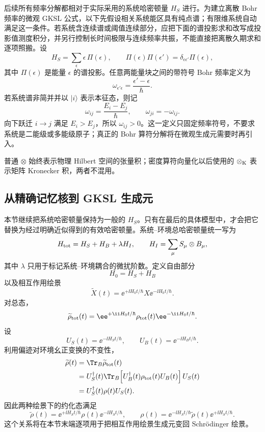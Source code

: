 后续所有频率分解都相对于实际采用的系统哈密顿量 $H_S$ 进行。为建立离散 Bohr 频率的微观 GKSL 公式，以下先假设相关系统能区具有纯点谱；有限维系统自动满足这一条件。若系统含连续谱或阈值连续部分，应把下面的谱投影求和改写成投影值测度积分，并另行控制长时间极限与连续频率共振，不能直接把离散久期求和逐项照搬。设
\begin{equation}
H_S=\sum_{\epsilon}\epsilon\,\Pi(\epsilon),
\qquad
\Pi(\epsilon)\Pi(\epsilon')=\delta_{\epsilon\epsilon'}\Pi(\epsilon),
\label{eq:phys-oqs-system-spectral-resolution}
\end{equation}
其中 $\Pi(\epsilon)$ 是能量 $\epsilon$ 的谱投影。任意两能量块之间的带符号 Bohr 频率定义为
\[
\omega_{\epsilon'\epsilon}=\frac{\epsilon'-\epsilon}{\hbar}.
\]
若系统谱非简并并以 $|i\rangle$ 表示本征态，则记
\begin{equation}
\omega_{ij}=\frac{E_i-E_j}{\hbar},
\qquad
\omega_{ji}=-\omega_{ij}.
\label{eq:phys-oqs-bohr-signed}
\end{equation}
向下跃迁 $i\to j$ 满足 $E_i>E_j$，所以 $\omega_{ij}>0$。这一定义只固定频率符号，不要求系统是二能级或多能级原子；真正的 Bohr 算符分解将在微观生成元需要时再引入。

普通 $\otimes$ 始终表示物理 Hilbert 空间的张量积；密度算符向量化以后使用的 $\mathbin{\otimes_{\rm K}}$ 表示矩阵 Kronecker 积，两者不混用。

\subsection{从精确记忆核到 GKSL 生成元}
\label{sec:phys-oqs-gksl}

本节继续把系统哈密顿量保持为一般的 $H_S$。只有在最后的具体模型中，才会把它替换为经过明确近似得到的有效哈密顿量。系统--环境总哈密顿量统一写为
\[
H_{\rm tot}=H_S+H_B+\lambda H_I,
\qquad
H_I=\sum_\mu S_\mu\otimes B_\mu,
\]
其中 $\lambda$ 只用于标记系统--环境耦合的微扰阶数。定义自由部分
\[
H_0=H_S+H_B
\]
以及相互作用绘景
\[
\widetilde X(t)
=\ee^{+\ii H_0t/\hbar}X\ee^{-\ii H_0t/\hbar}.
\]
对总态，
\[
\widetilde\rho_{\rm tot}(t)
=\ee^{+\ii H_0t/\hbar}
\rho_{\rm tot}(t)
\ee^{-\ii H_0t/\hbar}.
\]
设
\[
U_S(t)=\ee^{-\ii H_St/\hbar},
\qquad
U_B(t)=\ee^{-\ii H_Bt/\hbar}.
\]
利用偏迹对环境幺正变换的不变性，
\[
\begin{aligned}
\widetilde\rho(t)
&=\Tr_B\widetilde\rho_{\rm tot}(t)\\
&=U_S^\dagger(t)
\Tr_B\!\left[U_B^\dagger(t)\rho_{\rm tot}(t)U_B(t)\right]
U_S(t)\\
&=U_S^\dagger(t)\rho(t)U_S(t).
\end{aligned}
\]
因此两种绘景下的约化态满足
\begin{equation}
\widetilde\rho(t)
=\ee^{+\ii H_St/\hbar}\rho(t)
 \ee^{-\ii H_St/\hbar},
\qquad
\rho(t)
=\ee^{-\ii H_St/\hbar}\widetilde\rho(t)
 \ee^{+\ii H_St/\hbar}.
\label{eq:phys-oqs-picture-dictionary}
\end{equation}
这个关系将在本节末端逐项用于把相互作用绘景生成元变回 Schr\"odinger 绘景。

